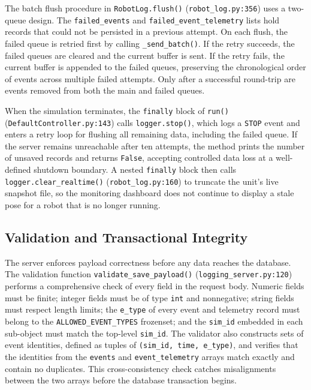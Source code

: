 The batch flush procedure in \texttt{RobotLog.flush()} (\texttt{robot\_log.py:356}) uses a two-queue design. The \texttt{failed\_events} and \texttt{failed\_event\_telemetry} lists hold records that could not be persisted in a previous attempt. On each flush, the failed queue is retried first by calling \texttt{\_send\_batch()}. If the retry succeeds, the failed queues are cleared and the current buffer is sent. If the retry fails, the current buffer is appended to the failed queues, preserving the chronological order of events across multiple failed attempts. Only after a successful round-trip are events removed from both the main and failed queues.

When the simulation terminates, the \texttt{finally} block of \texttt{run()} (\texttt{DefaultController.py:143}) calls \texttt{logger.stop()}, which logs a \texttt{STOP} event and enters a retry loop for flushing all remaining data, including the failed queue. If the server remains unreachable after ten attempts, the method prints the number of unsaved records and returns \texttt{False}, accepting controlled data loss at a well-defined shutdown boundary. A nested \texttt{finally} block then calls \texttt{logger.clear\_realtime()} (\texttt{robot\_log.py:160}) to truncate the unit's live snapshot file, so the monitoring dashboard does not continue to display a stale pose for a robot that is no longer running.

\subsection{Validation and Transactional Integrity}
\label{sec:logger-validation}

The server enforces payload correctness before any data reaches the database. The validation function \texttt{validate\_save\_payload()} (\texttt{logging\_server.py:120}) performs a comprehensive check of every field in the request body. Numeric fields must be finite; integer fields must be of type \texttt{int} and nonnegative; string fields must respect length limits; the \texttt{e\_type} of every event and telemetry record must belong to the \texttt{ALLOWED\_EVENT\_TYPES} frozenset; and the \texttt{sim\_id} embedded in each sub-object must match the top-level \texttt{sim\_id}. The validator also constructs sets of event identities, defined as tuples of \texttt{(sim\_id, time, e\_type)}, and verifies that the identities from the \texttt{events} and \texttt{event\_telemetry} arrays match exactly and contain no duplicates. This cross-consistency check catches misalignments between the two arrays before the database transaction begins.

